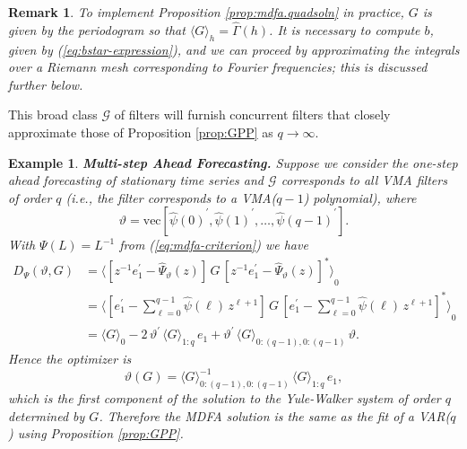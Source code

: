 \documentclass[a4paper]{book}
\def\tends{\rightarrow}
\newtheorem{Remark}{Remark}
\newtheorem{Example}{Example}
\begin{document}
\vspace{.5cm}


\begin{Remark} \rm
\label{rem:matrix.mdfa.soln}
 To implement Proposition \ref{prop:mdfa.quadsoln} in practice, $G$ is given by the
 periodogram so that ${ \langle G \rangle }_h = \widehat{\Gamma} (h)$.  
  It is necessary to compute $b$, given by (\ref{eq:bstar-expression}), 
  and we can proceed by approximating the integrals over a Riemann mesh corresponding
 to Fourier frequencies; this is discussed further below.
\end{Remark}

   This broad class $\mathcal{G}$ of filters
  will furnish concurrent filters that closely approximate those of
 Proposition \ref{prop:GPP} as $ q \tends \infty$.

\begin{Example} {\bf Multi-step Ahead Forecasting.}  \rm
\label{exam:multi-step.fore.4}
  Suppose we consider the   one-step ahead forecasting of stationary time series and
 $\mathcal{G} $ corresponds to   all VMA filters of   order $q$
  (i.e., the filter corresponds to a VMA($q-1$) polynomial), where  
\[
 \vartheta  = \mbox{vec} [{\widehat{\psi} (0) }^{\prime},
 {\widehat{\psi} (1) }^{\prime},   \ldots,
  {\widehat{\psi} (q-1) }^{\prime} ].
\]
 With $\Psi (L) = L^{-1}$ from (\ref{eq:mdfa-criterion}) we
 have 
\begin{align*}
 D_{\Psi} (\vartheta, G) & = 
 { \langle  \left[ z^{-1} e_1^{\prime} -  \widehat{\Psi}_{\vartheta} (z) \right] \,   G \,
  {  \left[ z^{-1} e_1^{\prime} -  \widehat{\Psi}_{\vartheta} (z) \right] }^{*} \rangle }_0 \\
 & = { \langle  \left[ e_1^{\prime} -  \sum_{\ell = 0}^{q-1} \widehat{\psi} (\ell)
    \, z^{\ell+1} \right] \, 
  G \,   {  \left[ e_1^{\prime} -  
 \sum_{\ell = 0}^{q-1} \widehat{\psi} (\ell) \, z^{\ell+1} \right]
  }^{*} \rangle }_0 \\
 & = { \langle G \rangle }_0 - 2 \, \vartheta^{\prime} \, { \langle G \rangle }_{1:q} 
 \, e_1    + \vartheta^{\prime} \, { \langle G \rangle }_{0:(q-1),0:(q-1)} \, \vartheta.
\end{align*}
 Hence the  optimizer is 
\[
 \vartheta (G) = { \langle G \rangle }_{0:(q-1),0:(q-1)}^{-1} \, 
   { \langle G \rangle }_{1:q} \, e_1,
\]
 which is the first component of the solution to the Yule-Walker system of order 
  $q$ determined by $G$.
  Therefore the MDFA solution is the same as the fit of a VAR($q$) using 
 Proposition \ref{prop:GPP}.
\end{Example}
 
\end{document}
